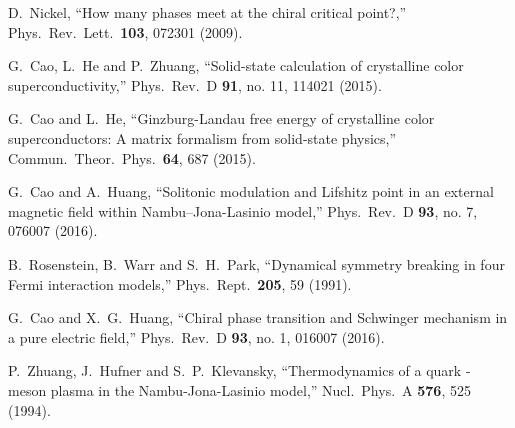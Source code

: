 \documentclass[aps,prd,amsmath,two column,amssymb,showpacs]{revtex4}
\begin{document}
\begin{thebibliography}{99}
D.~Nickel,
``How many phases meet at the chiral critical point?,''
Phys.\ Rev.\ Lett.\  {\bf 103}, 072301 (2009).%

G.~Cao, L.~He and P.~Zhuang,
``Solid-state calculation of crystalline color superconductivity,''
Phys.\ Rev.\ D {\bf 91}, no. 11, 114021 (2015).%

G.~Cao and L.~He,
``Ginzburg-Landau free energy of crystalline color superconductors: A matrix formalism from solid-state physics,''
Commun.\ Theor.\ Phys.\  {\bf 64}, 687 (2015).%

G.~Cao and A.~Huang,
``Solitonic modulation and Lifshitz point in an external magnetic field within Nambu–Jona-Lasinio model,''
Phys.\ Rev.\ D {\bf 93}, no. 7, 076007 (2016).%

B.~Rosenstein, B.~Warr and S.~H.~Park,
``Dynamical symmetry breaking in four Fermi interaction models,''
Phys.\ Rept.\  {\bf 205}, 59 (1991).

G.~Cao and X.~G.~Huang,
``Chiral phase transition and Schwinger mechanism in a pure electric field,''
Phys.\ Rev.\ D {\bf 93}, no. 1, 016007 (2016).%

P.~Zhuang, J.~Hufner and S.~P.~Klevansky,
``Thermodynamics of a quark - meson plasma in the Nambu-Jona-Lasinio model,''
Nucl.\ Phys.\ A {\bf 576}, 525 (1994).
\end{thebibliography}
\end{document}
